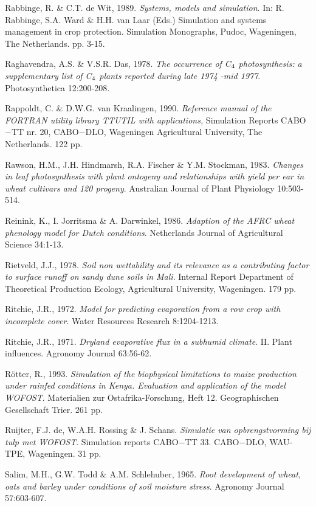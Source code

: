 Rabbinge, R. \& C.T. de Wit, 1989. {\it Systems, models and simulation\/}. In: R. Rabbinge, S.A. Ward
\& H.H. van Laar (Eds.) Simulation and systems management in crop protection. Simulation
Monographs, Pudoc, Wageningen, The Netherlands. pp. 3-15.

Raghavendra, A.S. \& V.S.R. Das, 1978. {\it The occurrence of C$_{{\rm 4}}$ photosynthesis: a supplementary list
of C$_{{\rm 4}}$ plants reported during late 1974 -mid 1977\/}. Photosynthetica 12:200-208.

Rappoldt, C. \& D.W.G. van Kraalingen, 1990. {\it Reference manual of the FORTRAN utility library
TTUTIL with applications,\/} Simulation Reports CABO$-$TT nr. 20, CABO$-$DLO, Wageningen
Agricultural University, The Netherlands. 122 pp. 

Rawson, H.M., J.H. Hindmarsh, R.A. Fischer \& Y.M. Stockman, 1983. {\it Changes in leaf
photosynthesis with plant ontogeny and relationships with yield per ear in wheat cultivars and 120
progeny\/}. Australian Journal of Plant Physiology 10:503-514.

Reinink, K., I. Jorritsma \& A. Darwinkel, 1986. {\it Adaption of the AFRC wheat phenology model for
Dutch conditions\/}. Netherlands Journal of Agricultural Science 34:1-13.

Rietveld, J.J., 1978. {\it Soil non wettability and its relevance as a contributing factor to surface runoff
on sandy dune soils in Mali\/}. Internal Report Department of Theoretical Production Ecology,
Agricultural University, Wageningen. 179 pp.

Ritchie, J.R., 1972. {\it Model for predicting evaporation from a row crop with incomplete cover\/}. Water
Resources Research 8:1204-1213.

Ritchie, J.R., 1971. {\it Dryland evaporative flux in a subhumid climate\/}. II. Plant influences. Agronomy
Journal 63:56-62.

R\"{o}tter, R., 1993. {\it Simulation of the biophysical limitations to maize production under rainfed
conditions in Kenya. Evaluation and application of the model WOFOST\/}. {\nobreak}Materialien zur Ostafrika-Forschung, Heft 12. {\nobreak}Geographischen Gesellschaft Trier. 261 pp.

Ruijter, F.J. de, W.A.H. Rossing \& J. Schans. {\it Simulatie van opbrengstvorming bij tulp met
WOFOST\/}. Simula\-tion reports CABO$-$TT 33. CABO$-$DLO, WAU-TPE, Wageningen. 31 pp.

Salim, M.H., G.W. Todd \& A.M. Schlehuber, 1965. {\it Root development of wheat, oats and barley
under conditions of soil moisture stress\/}. Agronomy Journal 57:603-607.

